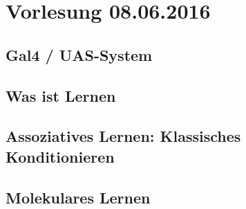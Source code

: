 \section{Vorlesung 08.06.2016}

\subsection{Gal4 / UAS-System}

\subsection{Was ist Lernen}

\subsection{Assoziatives Lernen: Klassisches Konditionieren}

\subsection{Molekulares Lernen}